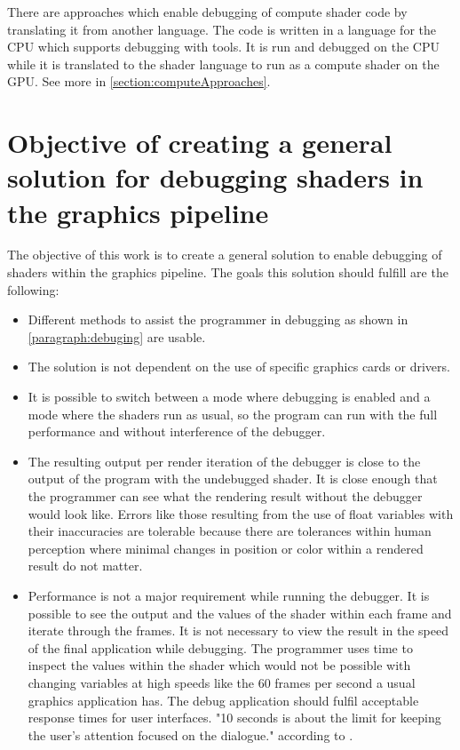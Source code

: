 There are approaches which enable debugging of compute shader code by translating it from another language. The code is written in a language for the CPU which supports debugging with tools. It is run and debugged on the CPU while it is translated to the shader language to run as a compute shader on the GPU.
See more in \autoref{section:computeApproaches}.

\section{Objective of creating a general solution for debugging shaders in the graphics pipeline}
\label{paragraph:objective}

The objective of this work is to create a general solution to enable debugging of shaders within the graphics pipeline. The goals this solution should fulfill are the following:

\begin{itemize}
	\item Different methods to assist the programmer in debugging as shown in \autoref{paragraph:debuging} are usable.
	\item The solution is not dependent on the use of specific graphics cards or drivers.
	\item It is possible to switch between a mode where debugging is enabled and a mode where the shaders run as usual, so the program can run with the full performance and without interference of the debugger.
	\item The resulting output per render iteration of the debugger is close to the output of the program with the undebugged shader. It is close enough that the programmer can see what the rendering result without the debugger would look like. Errors like those resulting from the use of float variables with their inaccuracies are tolerable because there are tolerances within human perception where minimal changes in position or color within a rendered result do not matter.
	\item Performance is not a major requirement while running the debugger. It is possible to see the output and the values of the shader within each frame and iterate through the frames. It is not necessary to view the result in the speed of the final application while debugging. The programmer uses time to inspect the values within the shader which would not be possible with changing variables at high speeds like the 60 frames per second a usual graphics application has. The debug application should fulfil acceptable response times for user interfaces. "10 seconds is about the limit for keeping the user's attention focused on the dialogue." according to .
\end{itemize}





